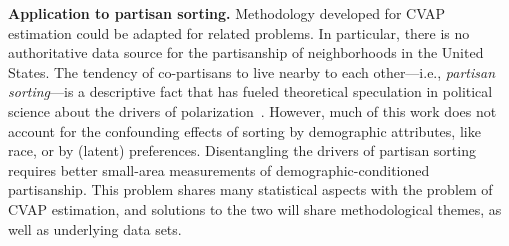 \documentclass[11pt]{article}
\begin{document}

\textbf{Application to partisan sorting.} Methodology developed for CVAP estimation could be adapted for related problems. In particular, there is no authoritative data source for the partisanship of neighborhoods in the United States. The tendency of co-partisans to live nearby to each other---i.e., \textit{partisan sorting}---is a descriptive fact that has fueled theoretical speculation in political science about the drivers of polarization~\citep{brown2021measurement}. However, much of this work does not account for the confounding effects of sorting by demographic attributes, like race, or by (latent) preferences. Disentangling the drivers of partisan sorting requires better small-area measurements of demographic-conditioned partisanship. This problem shares many statistical aspects with the problem of CVAP estimation, and solutions to the two will share methodological themes, as well as underlying data sets.




\end{document}

